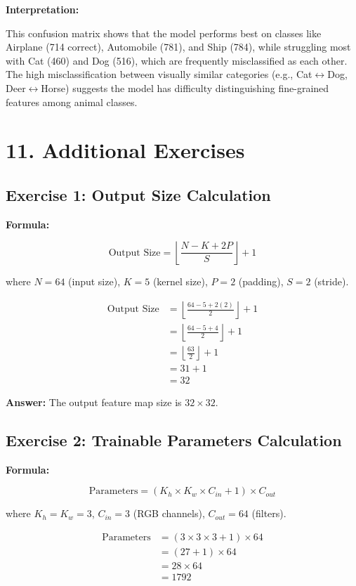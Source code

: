 \documentclass[11pt]{article}
\begin{document}
\textbf{Interpretation:}

This confusion matrix shows that the model performs best on classes like Airplane (714 correct), Automobile (781), and Ship (784), while struggling most with Cat (460) and Dog (516), which are frequently misclassified as each other. The high misclassification between visually similar categories (e.g., Cat$\leftrightarrow$Dog, Deer$\leftrightarrow$Horse) suggests the model has difficulty distinguishing fine-grained features among animal classes.

\section*{11. Additional Exercises}

\subsection*{Exercise 1: Output Size Calculation}

\textbf{Formula:}

\[
\text{Output Size}
=
\left\lfloor
\frac{N-K+2P}{S}
\right\rfloor+1
\]

where
$N=64$ (input size),
$K=5$ (kernel size),
$P=2$ (padding),
$S=2$ (stride).

\[
\begin{aligned}
\text{Output Size}
&=
\left\lfloor
\frac{64-5+2(2)}{2}
\right\rfloor+1\\
&=
\left\lfloor
\frac{64-5+4}{2}
\right\rfloor+1\\
&=
\left\lfloor
\frac{63}{2}
\right\rfloor+1\\
&=31+1\\
&=32
\end{aligned}
\]

\textbf{Answer:} The output feature map size is \textbf{$32\times32$}.

\subsection*{Exercise 2: Trainable Parameters Calculation}

\textbf{Formula:}

\[
\text{Parameters}
=
(K_h\times K_w\times C_{in}+1)\times C_{out}
\]

where
$K_h=K_w=3$,
$C_{in}=3$ (RGB channels),
$C_{out}=64$ (filters).

\[
\begin{aligned}
\text{Parameters}
&=
(3\times3\times3+1)\times64\\
&=
(27+1)\times64\\
&=
28\times64\\
&=
1792
\end{aligned}
\]
\end{document}

